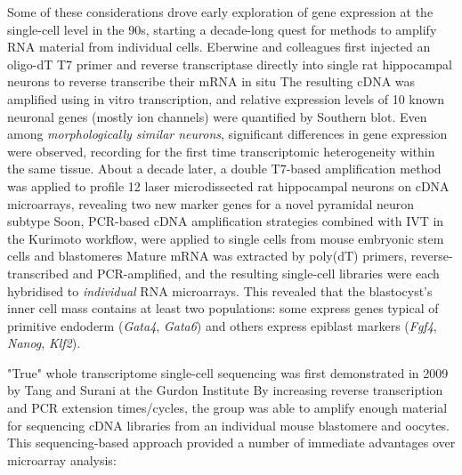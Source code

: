 Some of these considerations drove early exploration of gene expression at the single-cell level in the 90s, starting a decade-long quest for methods to amplify RNA material from individual cells. Eberwine and colleagues first injected an oligo-dT T7 primer and reverse transcriptase directly into single rat hippocampal neurons to reverse transcribe their mRNA in situ The resulting cDNA was amplified using in vitro transcription, and relative expression levels of 10 known neuronal genes (mostly ion channels) were quantified by Southern blot. Even among \textit{morphologically similar neurons}, significant differences in gene expression were observed, recording for the first time transcriptomic heterogeneity within the same tissue. About a decade later, a double T7-based amplification method was applied to profile 12 laser microdissected rat hippocampal neurons on cDNA microarrays, revealing two new marker genes for a novel pyramidal neuron subtype Soon, PCR-based cDNA amplification strategies combined with IVT in the Kurimoto workflow, were applied to single cells from mouse embryonic stem cells and blastomeres Mature mRNA was extracted by poly(dT) primers, reverse-transcribed and PCR-amplified, and the resulting single-cell libraries were each hybridised to \textit{individual} RNA microarrays. This revealed that the blastocyst's inner cell mass contains at least two populations: some express genes typical of primitive endoderm (\textit{Gata4}, \textit{Gata6}) and others express epiblast markers (\textit{Fgf4}, \textit{Nanog}, \textit{Klf2}).


"True" whole transcriptome single-cell sequencing was first demonstrated in 2009 by Tang and Surani at the Gurdon Institute By increasing reverse transcription and PCR extension times/cycles, the group was able to amplify enough material for sequencing cDNA libraries from an individual mouse blastomere and oocytes. This sequencing-based approach provided a number of immediate advantages over microarray analysis:

